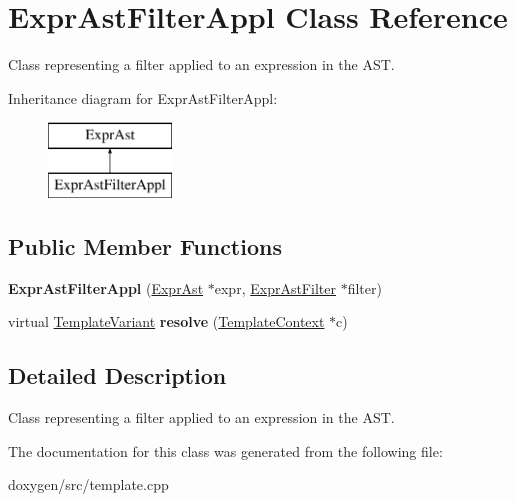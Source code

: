 \hypertarget{class_expr_ast_filter_appl}{}\section{Expr\+Ast\+Filter\+Appl Class Reference}
\label{class_expr_ast_filter_appl}


Class representing a filter applied to an expression in the A\+ST.  


Inheritance diagram for Expr\+Ast\+Filter\+Appl\+:\begin{figure}[H]
\begin{center}
\leavevmode
\includegraphics[height=2.000000cm]{class_expr_ast_filter_appl}
\end{center}
\end{figure}
\subsection*{Public Member Functions}
\begin{DoxyCompactItemize}
\item 
\mbox{\label{class_expr_ast_filter_appl_a7f851ad2d258a878727019f8e6d86532}} 
{\bfseries Expr\+Ast\+Filter\+Appl} (\mbox{\hyperlink{class_expr_ast}{Expr\+Ast}} $\ast$expr, \mbox{\hyperlink{class_expr_ast_filter}{Expr\+Ast\+Filter}} $\ast$filter)
\item 
\mbox{\label{class_expr_ast_filter_appl_aadbd0425767b093f0d37f6abf031ed69}} 
virtual \mbox{\hyperlink{class_template_variant}{Template\+Variant}} {\bfseries resolve} (\mbox{\hyperlink{class_template_context}{Template\+Context}} $\ast$c)
\end{DoxyCompactItemize}


\subsection{Detailed Description}
Class representing a filter applied to an expression in the A\+ST. 

The documentation for this class was generated from the following file\+:\begin{DoxyCompactItemize}
\item 
doxygen/src/template.\+cpp\end{DoxyCompactItemize}
